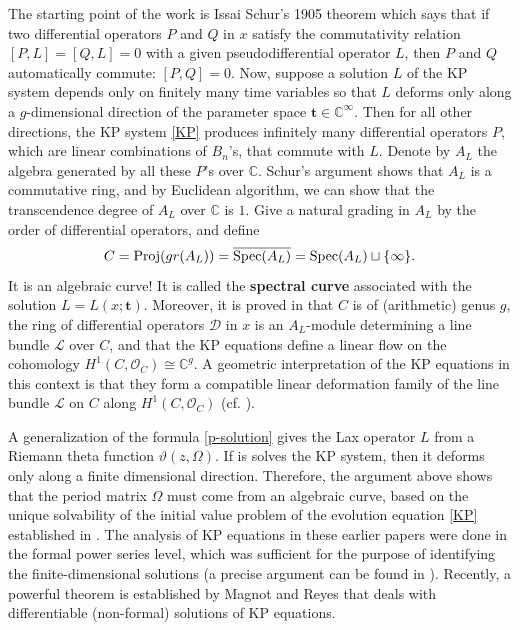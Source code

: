 \documentclass{amsart}
\theoremstyle{definition}
\numberwithin{equation}{section}
\numberwithin{figure}{section}
\def\isom{\cong}
\def\Spec{{\text{\rm{Spec}}}}
\def\Proj{{\text{\rm{Proj}}}}
\newcommand{\be}{\begin{equation}}
\newcommand{\ee}{\end{equation}}
\newcommand{\bC}{{\mathbb{C}}}
\newcommand{\cD}{{\mathcal{D}}}
\newcommand{\cL}{{\mathcal{L}}}
\newcommand{\cO}{{\mathcal{O}}}
\begin{document}
The starting point of the work \cite{M1984} is 
Issai Schur's 1905 theorem which says  that if two differential operators
$P$ and $Q$ in $x$ satisfy the commutativity relation 
$[P,L]=[Q,L]=0$ with a
given pseudodifferential operator $L$, then $P$ and $Q$
automatically commute: $[P,Q]=0$. Now, suppose 
a solution 
$L$ of the KP system depends only on finitely many time variables so that
$L$ deforms  only along a $g$-dimensional direction of the
parameter space $\mathbf{t}\in \bC^\infty$. Then for all other directions,
the KP system \eqref{KP} produces infinitely many differential operators $P$, 
which are linear combinations of $B_n$'s, that commute with $L$.
Denote by $A_L$ the  algebra generated by all these 
$P$'s over $\bC$. Schur's argument  shows that $A_L$ is a commutative 
ring, and by Euclidean algorithm, we can show that the transcendence
degree of $A_L$ over $\bC$ is $1$. Give a natural grading in $A_L$ by
the order of differential operators, and  define 
\be
\label{specL}
C = \Proj(gr(A_L)) = \overline{\Spec(A_L)}= \Spec(A_L)\sqcup \{\infty\}.
\ee
It is an algebraic curve! It is called the \textbf{spectral curve} associated with the 
solution $L=L(x; \mathbf{t})$. Moreover, it is proved 
in \cite{M1984} that $C$ is of (arithmetic) genus $g$, 
the ring of differential operators
$\cD$
in $x$ is an $A_L$-module determining
 a line bundle $\cL$ over $C$, and that the KP equations define a linear
flow on the cohomology $H^1(C,\cO_C)\isom \bC^g$.
A geometric interpretation of the KP equations in this context is that 
they form a
 compatible linear deformation family of the line 
bundle $\cL$ on $C$ along $H^1(C,\cO_C)$
(cf. \cite{LiM1997, M1984,M1994}).

A generalization of the formula \eqref{p-solution} gives the
Lax operator $L$ from a Riemann theta function $\vartheta(z,\Omega)$. 
If is solves the KP system, then it  deforms only along a finite dimensional
direction. Therefore, the argument above shows that the period matrix
$\Omega$ must come from an algebraic curve, based on the unique solvability
of the initial value problem of the evolution equation \eqref{KP} established
in \cite{M1984a, M1988}. The analysis of KP equations
in these earlier papers were done in the formal power series level, 
which was sufficient for the purpose of identifying the finite-dimensional
solutions (a precise argument can be found in \cite{LiM1997}). 
Recently, a powerful theorem is established by 
Magnot and Reyes \cite{MagnotR} that deals with differentiable 
(non-formal) solutions
of KP equations. 
\end{document}
